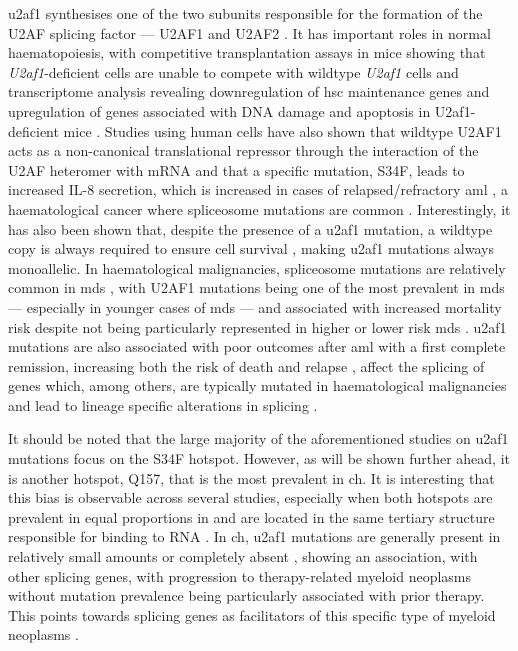 \Ac{u2af1} synthesises one of the two subunits responsible for the formation of the U2AF splicing factor --- U2AF1 and U2AF2 \cite{Palangat2019-nv}. It has important roles in normal haematopoiesis, with competitive transplantation assays in mice showing that \textit{U2af1}-deficient cells are unable to compete with wildtype \textit{U2af1} cells and transcriptome analysis revealing downregulation of \ac{hsc} maintenance genes and upregulation of genes associated with DNA damage and apoptosis in U2af1-deficient mice \cite{Dutta2020-ah}. Studies using human cells have also shown that wildtype U2AF1 acts as a non-canonical translational repressor through the interaction of the U2AF heteromer with mRNA and that a specific mutation, S34F, leads to increased IL-8 secretion, which is increased in cases of relapsed/refractory \ac{aml} \cite{Palangat2019-nv}, a haematological cancer where spliceosome mutations are common \cite{Papaemmanuil2016-jy}. Interestingly, it has also been shown that, despite the presence of a \ac{u2af1} mutation, a wildtype copy is always required to ensure cell survival \cite{Fei2016-cc,Wadugu2020-df}, making \ac{u2af1} mutations always monoallelic. In haematological malignancies, spliceosome mutations are relatively common in \ac{mds} \cite{Yoshida2011-zp}, with U2AF1 mutations being one of the most prevalent in \ac{mds} --- especially in younger cases of \ac{mds} --- and associated with increased mortality risk despite not being particularly represented in higher or lower risk \ac{mds} \cite{Li2018-vz}. \ac{u2af1} mutations are also associated with poor outcomes after \ac{aml} with a first complete remission, increasing both the risk of death and relapse \cite{Saygin2018-bb}, affect the splicing of genes which, among others, are typically mutated in haematological malignancies \cite{Przychodzen2013-vb} and lead to lineage specific alterations in splicing \cite{Yip2017-kf}. 

It should be noted that the large majority of the aforementioned studies on \ac{u2af1} mutations focus on the S34F hotspot. However, as will be shown further ahead, it is another hotspot, Q157, that is the most prevalent in \ac{ch}. It is interesting that this bias is observable across several studies, especially when both hotspots are prevalent in equal proportions in and are located in the same tertiary structure responsible for binding to RNA \cite{Adema2016-fa}. In \ac{ch}, \ac{u2af1} mutations are generally present in relatively small amounts or completely absent \cite{Bolton2020-ct,Jaiswal2014-rl,Genovese2014-eu,Xie2014-np}, showing an association, with other splicing genes, with progression to therapy-related myeloid neoplasms without mutation prevalence being particularly associated with prior therapy. This points towards splicing genes as facilitators of this specific type of myeloid neoplasms \cite{Bolton2020-ct}. 

